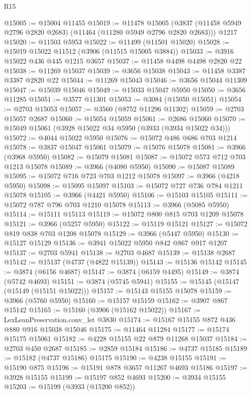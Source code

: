 \begin{lexlean}{R15}
\begin{coremodule}
@15005 := @15004 @11455
@15019 := @11478
    @15005
    (@3837 (@11458 @5949 @2796 @2820 @2683) (@11464 (@11280 @5949 @2796 @2820 @2683)))
    @1217
@15020 := @11503 @5953
@15022 := @11499 (@11501 @15020)
@15028 := @15019 @15022 @11512 (@3906 (@11515 @15005 @3884))
@15033 := @3916 @15022 @436 @445 @1215 @3657
@15037 := @11458 @4498 @4498 @2820 @22
@15038 := @11269 @15037
@15039 := @3656 @15038
@15043 := @11458 @3387 @3387 @2820 @22
@15044 := @11269 @15043
@15046 := @3656 @15044 @11309
@15047 := @15039 @15046
@15049 := @15033 @15047 @5950
@15050 := @3656 @11285
@15051 := @3577 @11301
@15053 := @3084 (@15050 @15051)
@15054 := @2703 @15053
@15057 := @3560 (@8752 @11296 @11302)
@15059 := @2703 @15057 @2687
@15060 := @15054 @15059
@15061 := @2686 @15060
@15070 := @15049 @15061 (@3928 @15022 @34 @5950 (@3933 (@3934 @15022 @34)))
@15072 := @4044 @15022 @5950
@15076 := @15072 @486 @686 @703 @1214
@15078 := @3837 @15047 @15061
@15079 := @15076 @15078
@15081 := @3966 (@3968 @5950)
@15082 := @15079 @15081
@15087 := @15072 @573 @712 @703 @1213 @15078
@15089 := @3966 (@4080 @5950)
@15090 := @15087 @15089
@15095 := @15072 @716 @723 @703 @1212 @15078
@15097 := @3966 (@4218 @5950)
@15098 := @15095 @15097
@15103 := @15072 @727 @736 @784 @1211 @15078
@15105 := @3966 (@4421 @5950)
@15106 := @15103 @15105
@15111 := @15072 @787 @796 @703 @1210 @15078
@15113 := @3966 (@5085 @5950)
@15114 := @15111 @15113
@15119 := @15072 @800 @815 @703 @1209 @15078
@15121 := @3966 (@5257 @5950)
@15122 := @15119 @15121
@15127 := @15072 @819 @838 @703 @1208 @15078
@15129 := @3966 (@5447 @5950)
@15130 := @15127 @15129
@15136 := @3941 @15022 @5950 @842 @867 @917 @1207
@15137 := @2703 @5941
@15138 := @2703 @4687
@15139 := @15138 @2687
@15142 := @15137 (@4737 (@4822 @15139))
@15143 := @15136 @15142
@15145 := @3874 (@6156 @4687)
@15147 := @3874 (@6159 @4495)
@15149 := @3874 (@5742 @4693)
@15151 := @3874 (@5745 @5941)
@15155 := @15145 (@15147 (@15149 (@15151 @15022)))
@15157 := @15143 @15155 @15078
@15159 := @3966 (@5760 @5950)
@15160 := @15157 @15159
@15162 := @3907 @867 @15142
@15165 := @15160 (@3906 (@15162 @15022))
@15167 := LexLeanPreservation.conv_let @3830
@15174 := @15167 @15155 @872 @436 @880 @916 @15038 @15046
@15175 := @11464 @11284
@15177 := @15174 @15175 @15061
@15182 := @4228 @15155 @22 @879 @11268 @15037
@15184 := @2703 @450 @2687
@15185 := @2859 @15184
@15186 := @4737 @15185
@15189 := @15182 (@4737 @15186) @15175
@15190 := @4238 @15155
@15191 := @15190 @875
@15196 := @15191 @878 @3657 @11267 @4693 @15186
@15197 := @3928 @15155
@15199 := @15197 @852 @4693
@15200 := @3934 @15155
@15203 := @15199 (@3933 (@15200 @852))

\end{coremodule}
\end{lexlean}
